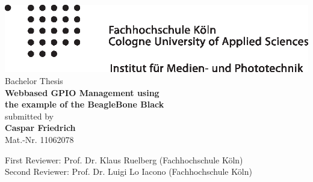 \begin{otherlanguage}{english}

\begin{titlepage}
\begin{center}

\includegraphics[width = \textwidth]{images/imp_rechts.eps}\\[3cm]

Bachelor Thesis\\[0.5cm]
{\sffamily \bfseries \Huge Webbased GPIO Management using\\[0.25cm]
the example of the BeagleBone Black}\\[2cm]

submitted by\\[0.5cm]
\textbf{Caspar Friedrich}\\[0.5cm]
Mat.-Nr. 11062078\\[0.5cm]

\vfill

First Reviewer: Prof. Dr. Klaus Ruelberg (Fachhochschule Köln)\\[0.5cm]
Second Reviewer: Prof. Dr. Luigi Lo Iacono (Fachhochschule Köln)\\[0.5cm]
\monthname ~\the\year

\end{center}
\end{titlepage}

\end{otherlanguage}